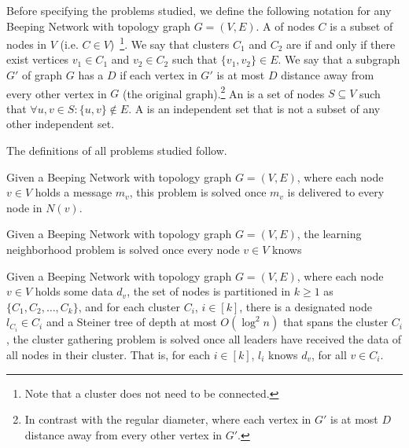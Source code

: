 Before specifying the problems studied, we define the following notation for any Beeping Network with topology graph $G=(V,E)$.
%
A  of nodes $C$ is a subset of nodes in $V$ (i.e. $C\in V$)~\footnote{Note that a cluster does not need to be connected.}.
%
We say that clusters $C_1$ and $C_2$ are  if and only if there exist vertices $v_1 \in C_1$ and $v_2 \in C_2$ such that $\{v_1,v_2\} \in E$.
%
We say that a subgraph $G'$ of graph $G$ has a  $D$ if each vertex in $G'$ is at most $D$ distance away from every other vertex in $G$ (the original graph).\footnote{In contrast with the regular diameter, where each vertex in $G'$ is at most $D$ distance away from every other vertex in $G'$.
}
%
An  is a set of nodes $S\subseteq V$ such that $\forall u,v \in S : \{u,v\}\notin E$.
A  is an independent set that is not a subset of any other independent set. 

The definitions of all problems studied follow. 

Given a Beeping Network with topology graph $G=(V,E)$, where each node $v\in V$ holds a message $m_v$, this problem is solved once $m_v$ is delivered to every node in $N(v)$. 

Given a Beeping Network with topology graph $G=(V,E)$, the learning neighborhood problem is solved once every node $v\in V$ knows  

Given a Beeping Network with topology graph $G=(V,E)$, where 
each node $v\in V$ holds some data $d_v$, 
the set of nodes is partitioned in $k\geq 1$  as $\{C_1,C_2,\dots,C_k\}$, and 
for each cluster $C_i$, $i\in[k]$, there is a designated  node $l_{C_i}\in C_i$ and a Steiner tree of depth at most $O(\log^2 n)$ that spans the cluster $C_i$,
the cluster gathering problem is solved once all leaders have received the data of all nodes in their cluster. That is, for each $i\in [k]$, $l_i$ knows $d_v$, for all $v\in C_i$.

